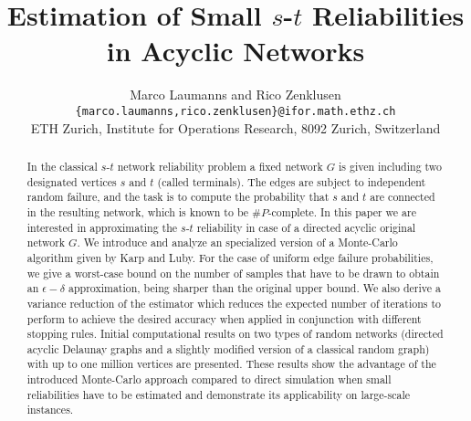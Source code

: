 \documentclass{article}
\begin{document}
\title{Estimation of Small $s$-$t$ Reliabilities in Acyclic Networks}
\author{Marco Laumanns and Rico Zenklusen \\
\small\texttt{\{marco.laumanns,rico.zenklusen\}@ifor.math.ethz.ch}\\
\small ETH Zurich, Institute for Operations Research, 8092 Zurich, Switzerland
}

\maketitle


\begin{abstract}
In the classical $s$-$t$ network reliability
problem a fixed network $G$ is given including two designated
vertices $s$ and $t$ (called terminals). The edges are
subject to independent random failure, and the task is to compute
the probability that $s$ and $t$ are connected in
the resulting network, which is known to be $\#P$-complete.
In this paper we are interested in approximating the $s$-$t$
reliability in case of a directed acyclic original
network $G$. We introduce and analyze an
specialized version of a Monte-Carlo algorithm given
by Karp and Luby. 
For the case of uniform edge failure probabilities, we
give a \mbox{worst-case} bound on the number of samples that
have to be drawn to obtain an $\epsilon-\delta$ approximation,
being sharper than the original upper bound.
We also derive a variance reduction of the
estimator which reduces the expected number of iterations
to perform to achieve the desired accuracy when
applied in conjunction with different stopping rules.
Initial computational results on two types of random networks
(directed acyclic Delaunay graphs and a slightly modified version
of a classical random graph) with up to one million vertices are presented.
These results show the advantage of the introduced Monte-Carlo approach compared
to direct simulation when small reliabilities have to
be estimated and demonstrate its applicability on \mbox{large-scale}
instances.

\end{abstract}
\end{document}
